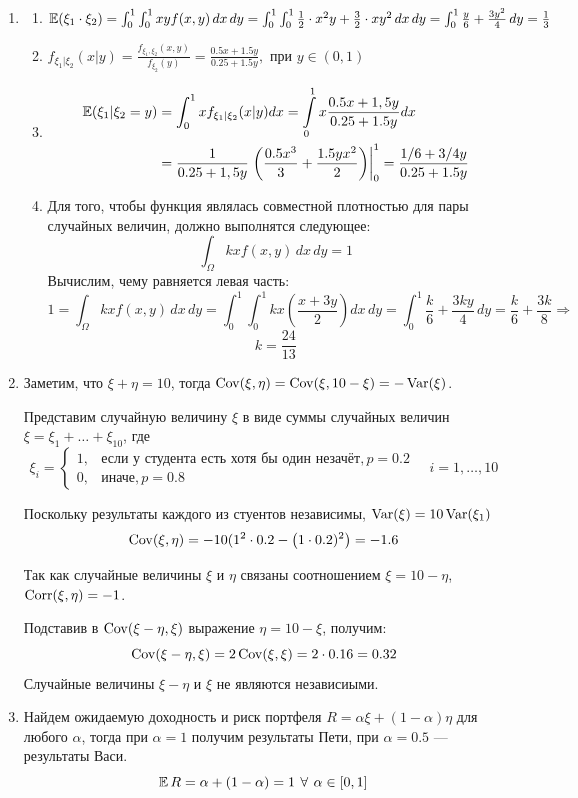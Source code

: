 \begin{enumerate}
\item
\begin{enumerate}
\item $ \operatorname{\mathbb{E}}({\xi_1 \cdot \xi_2}) = \int_{0}^1 \int_0^1 xy f(x,y) \, dx \, dy = \int_0^1 \int_0^1 \frac{1}{2}\cdot x^2y + \frac{3}{2}\cdot xy^2 \, dx \, dy = \int_{0}^1 \frac{y}{6} + \frac{3y^2}{4} \,dy = \frac{1}{3}$
\item $f_{\xi_1 | \xi_2} (x | y) = \frac{f_{\xi_1, \xi_2}(x, y)}{f_{\xi_2}(y)} = \frac{0.5x + 1.5y}{0.25 + 1.5y}, \text{ при } y \in (0,1)$
\item
\begin{align*}
\operatorname{\mathbb{E}}(\xi_1 | \xi_2 = y) &= \int_0^1 x f_{\xi_1 | \xi_2} (x | y) dx = \int\limits_{0}^{1}  x \frac{0.5x + 1,5y}{0.25 + 1.5y} dx \\
&= \frac{1}{0.25 + 1,5y}  \left. \left( \dfrac{0.5x^3}{3} +  \dfrac{1.5yx^2}{2} \right) \right|_0^1  =  \frac{1/6 + 3/4y}{0.25 + 1.5y}
\end{align*}
\item
Для того, чтобы функция являлась совместной плотностью для пары случайных величин, должно выполнятся следующее:
\[
\int_{\Omega} kx f(x,y) \, dx \, dy = 1
\]
Вычислим, чему равняется левая часть:
\[
1 = \int_{\Omega} kx f(x,y) \, dx \, dy = \int_{0}^1 \int_{0}^1 kx \left(\frac{x + 3y}{2}\right) dx \, dy = \int_{0}^1 \frac{k}{6} + \frac{3ky}{4} \, dy = \frac{k}{6} + \frac{3k}{8} \Rightarrow
\]
\[
k = \frac{24}{13}
\]
\end{enumerate}
\item Заметим, что $\xi + \eta = 10$, тогда $\operatorname{Cov}(\xi, \eta) = \operatorname{Cov}(\xi, 10-\xi) = -\operatorname{Var}(\xi)$.

Представим случайную величину $\xi$ в виде суммы случайных величин $\xi = \xi_1 + \ldots + \xi_{10}$, где
\[
\xi_i = \begin{cases}
1, & \text{если у студента есть хотя бы один незачёт}, p=0.2 \\
0, & \text{иначе}, p=0.8
\end{cases} \quad i = 1, \ldots, 10
\]

Поскольку результаты каждого из стуентов независимы, $\operatorname{Var}(\xi) = 10\operatorname{Var}(\xi_1)$
\[
\operatorname{Cov}(\xi, \eta) = -10(1^2 \cdot 0.2 - \left(1\cdot 0.2)^2\right) = -1.6
\]

Так как случайные величины $\xi$ и $\eta$ связаны соотношением $\xi = 10 - \eta$, $\operatorname{Corr}(\xi, \eta)=-1$.

Подставив в $\operatorname{Cov}(\xi - \eta, \xi)$ выражение $\eta = 10 - \xi$, получим:
\[
\operatorname{Cov}(\xi - \eta, \xi) = 2 \operatorname{Cov}(\xi, \xi) = 2 \cdot 0.16 = 0.32
\]
Случайные величины $\xi - \eta$ и $\xi$ не являются независиыми.
\item Найдем ожидаемую доходность и риск портфеля $R = \alpha \xi + (1-\alpha) \eta$
для любого $\alpha$, тогда при $\alpha = 1$ получим результаты Пети,
при $\alpha = 0.5$ — результаты Васи.
\[
\operatorname{\mathbb{E}} R = \alpha + (1-\alpha) = 1 \: \, \forall \, \: \alpha \in [0,1]
\]


\end{enumerate}
